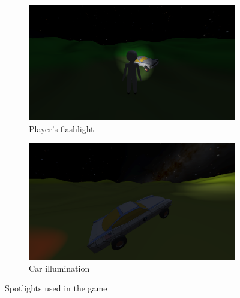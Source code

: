 \begin{figure}[h]
    \centering
    \begin{subfigure}[b]{0.475\textwidth}
        \centering
        \includegraphics[width=\textwidth]{chapters/theoretical_foundations/sections/lighting/resources/player-flashlight.png}
        \caption[]%
        {{\small Player's flashlight}}
        \label{fig:spotlight-player}
    \end{subfigure}
    \hfill
    \begin{subfigure}[b]{0.475\textwidth}
        \centering
        \includegraphics[width=\textwidth]{chapters/theoretical_foundations/sections/lighting/resources/car-lights-spot.png}
        \caption[]%
        {{\small Car illumination}}
        \label{fig:spotlight-car}
    \end{subfigure}
    \caption[]
    {\small Spotlights used in the game}
    \label{fig:spotlights}
\end{figure}